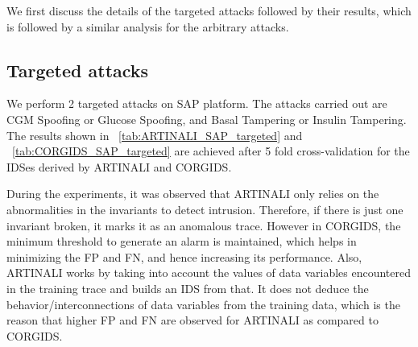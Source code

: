 We first discuss the details of the targeted attacks followed by their results, which is followed by a similar analysis for the arbitrary attacks.

\subsection{Targeted attacks}
We perform 2 targeted attacks on \ac{SAP} platform. The attacks carried out are \ac{CGM} Spoofing or Glucose Spoofing, and Basal Tampering or Insulin Tampering. The results shown in ~\autoref{tab:ARTINALI_SAP_targeted} and ~\autoref{tab:CORGIDS_SAP_targeted} are achieved after 5 fold cross-validation for the \ac{IDS}es derived by ARTINALI and \ac{CORGIDS}.

\begin{table}
\centering
  \caption{Results of intrusion detection by ARTINALI for targeted attack on \ac{SAP} platform}
  \label{tab:ARTINALI_SAP_targeted}
\end{table}


\begin{table}
\centering
  \caption{Results of intrusion detection by \ac{CORGIDS} for targeted attack on \ac{SAP} platform}
  \label{tab:CORGIDS_SAP_targeted}
\end{table}



During the experiments, it was observed that ARTINALI only relies on the abnormalities in the invariants to detect intrusion. Therefore, if there is just one invariant broken, it marks it as an anomalous trace. However in \ac{CORGIDS}, the minimum threshold to generate an alarm is maintained, which helps in minimizing the \ac{FP} and \ac{FN}, and hence increasing its performance. Also, ARTINALI works by taking into account the values of data variables encountered in the training trace and builds an \ac{IDS} from that. It does not deduce the behavior/interconnections of data variables from the training data, which is the reason that higher \ac{FP} and \ac{FN} are observed for ARTINALI as compared to \ac{CORGIDS}.

